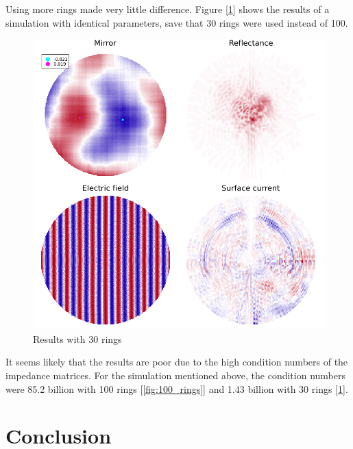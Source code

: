 \documentclass[etd,twoside,senior]{BYUPhys}
\begin{document}
Using more rings made very little difference. Figure [\ref{fig:30_rings}] shows the results of a simulation with identical parameters, save that 30 rings were used instead of 100.

\begin{figure}
  \centerline{\includegraphics[width=\textwidth]{30-ring-results}}
  \caption[Results with 30 rings]{\label{fig:30_rings}
    Results with 30 rings}
\end{figure}

It seems likely that the results are poor due to the high condition numbers of the impedance matrices. For the simulation mentioned above, the condition numbers were 85.2 billion with 100 rings [\ref{fig:100_rings}] and 1.43 billion with 30 rings [\ref{fig:30_rings}].







\chapter{Conclusion}\label{chap:conclusion}
\end{document}
